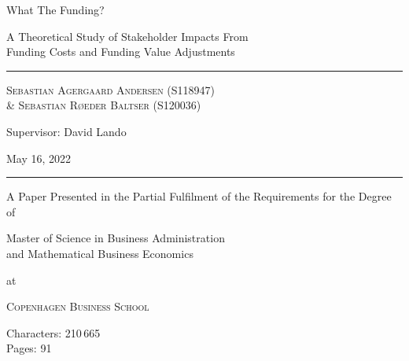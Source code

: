 \documentclass[main.tex]{subfiles}
\begin{document}
	\begin{titlepage}
	\begin{singlespace}
		\centering
		\vspace{5cm}
		{\fontsize{48pt}{1pt}\selectfont What The Funding? \par}
		\vspace{0.5cm}
		{\Large A Theoretical Study of Stakeholder Impacts From \\ 
				Funding Costs and Funding Value Adjustments \par}
		\rule{\textwidth}{1px}\par
		{\scshape\large 
			Sebastian Agergaard Andersen {\scriptsize(S118947)} \\ %
			\& Sebastian Røeder Baltser {\scriptsize(S120036)} %
		\par}
		Supervisor: David Lando \\
		

		\scalebox{0.95}{%
			\begin{tikzpicture}[remember picture,overlay,shift={([yshift=0.5cm]current page.center)}]
				
			\end{tikzpicture}        
		}
		\vfill
		
		{\Large May 16, 2022 \par}		
		\rule{\textwidth}{1px}\par
		{A Paper Presented in the Partial Fulfilment
		 of the Requirements for the Degree of \\}
		{\Large Master of Science in Business Administration \\
				and Mathematical Business Economics \par}
		at \par 
		{\scshape\LARGE Copenhagen Business School\par}
		\vspace{0.5cm}
		Characters: 210\,665 \\
		Pages: 91
		
		\thispagestyle{empty}
	\end{singlespace}
	\end{titlepage}
	\restoregeometry
\end{document}
